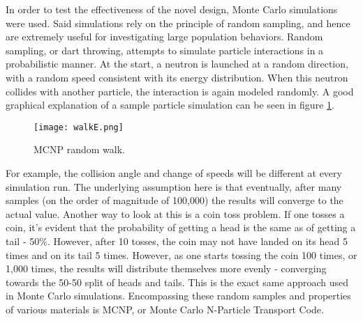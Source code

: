 In order to test the effectiveness of the novel design, Monte Carlo simulations were used. Said simulations rely on the principle of random sampling, and hence are extremely useful for investigating large population behaviors. Random sampling, or dart throwing, attempts to simulate particle interactions in a probabilistic manner. At the start, a neutron is launched at a random direction, with a random speed consistent with its energy distribution. When this neutron collides with another particle, the interaction is again modeled randomly. A good graphical explanation of a sample particle simulation can be seen in figure \ref{fig:randomwalk}.
\begin{figure}[!htbp]
\caption{MCNP random walk.}
\label{fig:randomwalk}
\centering
\texttt{[image: walkE.png]}
\end{figure}
For example, the collision angle and change of speeds will be different at every simulation run. The underlying assumption here is that eventually, after many samples (on the order of magnitude of 100,000) the results will converge to the actual value. Another way to look at this is a coin toss problem. If one tosses a coin, it's evident that the probability of getting a head is the same as of getting a tail - 50\%. However, after 10 tosses, the coin may not have landed on its head 5 times and on its tail 5 times. However, as one starts tossing the coin 100 times, or 1,000 times, the results will distribute themselves more evenly - converging towards the 50-50 split of heads and tails. This is the exact same approach used in Monte Carlo simulations. Encompassing these random samples and properties of various materials is MCNP, or Monte Carlo N-Particle Transport Code.

